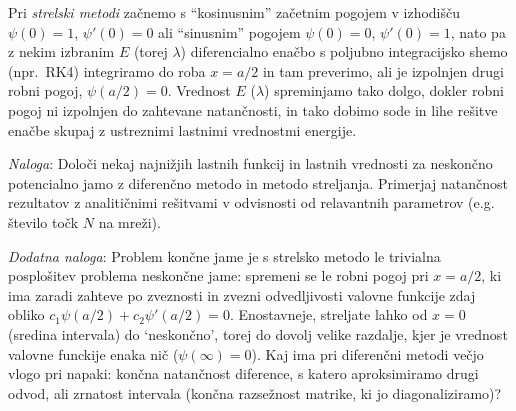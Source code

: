 \documentclass[slovene,11pt,a4paper]{article}
\begin{document}
\smallskip

Pri {\sl strelski metodi\/} začnemo s ``kosinusnim'' začetnim pogojem
v izhodišču $\psi(0)=1$, $\psi'(0)=0$ ali ``sinusnim'' pogojem
$\psi(0)=0$, $\psi'(0)=1$, nato pa z nekim izbranim $E$ (torej $\lambda$) diferencialno
enačbo s poljubno integracijsko shemo (npr.~RK4) integriramo do roba
$x=a/2$ in tam preverimo, ali je izpolnjen drugi robni pogoj, $\psi(a/2)=0$.
Vrednost $E$ ($\lambda$) spreminjamo tako dolgo, dokler robni pogoj ni izpolnjen do
zahtevane natančnosti, in tako dobimo sode in lihe rešitve enačbe
skupaj z ustreznimi lastnimi vrednostmi energije.

\medskip

{\it Naloga\/}: Določi nekaj najnižjih lastnih funkcij in lastnih
vrednosti za neskončno potencialno jamo z diferenčno metodo in metodo streljanja.
Primerjaj natančnost rezultatov z analitičnimi rešitvami v odvisnosti od
relavantnih parametrov (e.g. število točk $N$ na mreži).

\bigskip

{\it Dodatna naloga\/}:
Problem končne jame je s strelsko metodo le trivialna posplošitev
problema neskončne jame: spremeni se le robni pogoj pri $x=a/2$,
ki ima zaradi zahteve po zveznosti in zvezni odvedljivosti valovne
funkcije zdaj obliko $c_1\psi(a/2) + c_2\psi'(a/2) = 0$.
Enostavneje, streljate lahko od $x=0$ (sredina intervala) do `neskončno',
torej do dovolj velike razdalje, kjer je vrednost valovne funckije enaka nič ($\psi(\infty)=0$).
Kaj ima pri diferenčni metodi večjo vlogo pri napaki:
končna natančnost diference, s katero aproksimiramo drugi odvod,
ali zrnatost intervala (končna razsežnost matrike, ki jo
diagonaliziramo)?
\end{document}
